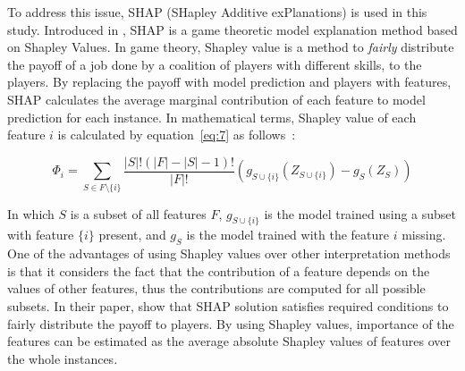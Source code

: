 To address this issue, SHAP (SHapley Additive exPlanations) is used in this study. Introduced in \citep{lundberg2017unified}, SHAP is a game theoretic model explanation method based on Shapley Values. In game theory, Shapley value is a method to \textit{fairly} distribute the payoff of a job done by a coalition of players with different skills, to the players. By replacing the payoff with model prediction and players with features, SHAP calculates the average marginal contribution of each feature to model prediction for each instance. In mathematical terms, Shapley value of each feature $i$ is calculated by equation~\ref{eq:7} as follows~\citep{lipovetsky2001analysis}:
\begin{linenomath}
\begin{equation}
\label{eq:7}
\Phi_i = \sum_{S \in F \setminus \{i\}} \frac{|S|! (|F| - |S| -1)!}{|F|!} \left(
g_{S\cup\{i\}}(Z_{S\cup\{i\}}) - g_S(Z_S) \right)
\end{equation}
\end{linenomath}
In which $S$ is a subset of all features $F$, $g_{S\cup\{i\}}$ is the model trained using a subset with feature $\{i\}$ present, and $g_S$ is the model trained with the feature $i$ missing. One of the advantages of using Shapley values over other interpretation methods is that it considers the fact that the contribution of a feature depends on the values of other features, thus the contributions are computed for all possible subsets. In their paper, \citet{lundberg2017unified} show that SHAP solution satisfies required conditions to fairly distribute the payoff to players. By using Shapley values, importance of the features can be estimated as the average absolute Shapley values of features over the whole instances. 